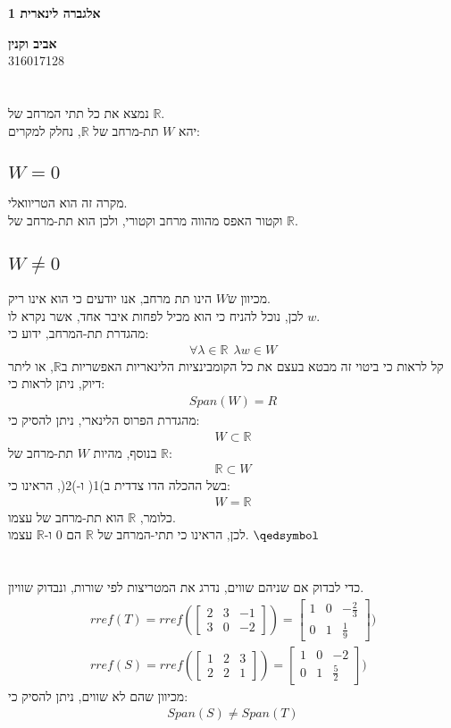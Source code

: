 \documentclass[a4paper, 12pt, leqno]{article}
\newcommand{\sub}[1]{\subsection{\underline{#1}}}
\newcommand{\RR}{\mathbb{R}}
\newcommand{\eq}[1]{\begin{align*}#1\end{align*}}
\newcommand{\eqn}[1]{\begin{align}#1\end{align}}
\renewcommand{\qed}{\hfill\(\qedsymbol\)}
\begin{document}
\begin{titlepage}
    \begin{center}
        \vspace*{4cm}
        {\fontsize{35pt}{35pt}\selectfont \textbf{אלגברה לינארית 1}}
        \vspace{0.4cm}

        {}
        \vfill

        {\Large\textbf{אביב וקנין}\\
        316017128}
    \end{center}
\end{titlepage}

\setcounter{section}{3}
\section{}
נמצא את כל תתי המרחב של $\RR$.\\
יהא $W$ תת-מרחב של $\RR$, נחלק למקרים:
\sub{$W=0$}
מקרה זה הוא הטריוואלי.\\
וקטור האפס מהווה מרחב וקטורי, ולכן הוא תת-מרחב של $\RR$.
\sub{$W\neq0$}
מכיוון ש$W$ הינו תת מרחב, אנו יודעים כי הוא אינו ריק.\\
לכן, נוכל להניח כי הוא מכיל לפחות איבר אחד, אשר נקרא לו $w$.\\
מהגדרת תת-המרחב, ידוע כי:
\eq{
    \forall\lambda\in\RR~~\lambda{w}\in{W}
}
קל לראות כי ביטוי זה מבטא בעצם את כל הקומבינציות הלינאריות האפשריות ב$\RR$, או ליתר דיוק, ניתן לראות כי:
\eq{
    Span(W)=R
}
מהגדרת הפרוס הלינארי, ניתן להסיק כי:
\eqn{
    W\subset\RR
}
בנוסף, מהיות $W$ תת-מרחב של $\RR$:
\eqn{
    \RR\subset{W}
}
בשל ההכלה הדו צדדית ב)1( ו-)2(, הראינו כי:
\eq{
    W=\RR
}
כלומר, $\RR$ הוא תת-מרחב של עצמו.\\
לכן, הראינו כי תתי-המרחב של $\RR$ הם $0$ ו-$\RR$ עצמו.
\qed\pagebreak

\setcounter{section}{6}
\section{}
כדי לבדוק אם שניהם שווים, נדרג את המטריצות לפי שורות, ונבדוק שוויון.
\eq{
    rref(T)=
        rref(
        \begin{bmatrix}
            2&3&-1\\3&0&-2
        \end{bmatrix}
        )
        =
        \begin{bmatrix}
            1&0&-\frac{2}{3}\\0&1&\frac{1}{9}
        \end{bmatrix}
    )
    \\
    rref(S)=
        rref(
        \begin{bmatrix}
            1&2&3\\2&2&1
        \end{bmatrix}
        )
        =
        \begin{bmatrix}
            1&0&-2\\0&1&\frac{5}{2}
        \end{bmatrix}
    )
}
מכיוון שהם לא שווים, ניתן להסיק כי:
\eq{
    Span(S)\neq{Span(T)}
}
\end{document}
